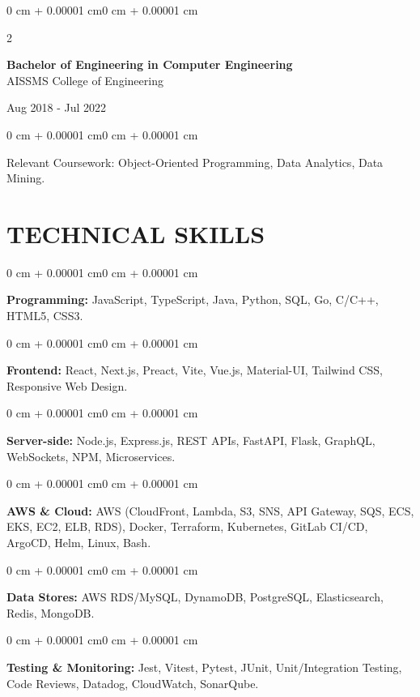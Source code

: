 \documentclass[10pt, letterpaper]{article}
\newenvironment{onecolentry}{
    \begin{adjustwidth}{0 cm + 0.00001 cm}{0 cm + 0.00001 cm}
}{
    \end{adjustwidth}
}
\newenvironment{twocolentry}[2][]{
    \onecolentry
    \def\secondColumn{#2}
    \setcolumnwidth{\fill, 4.5 cm}
    \begin{paracol}{2}
}{
    \switchcolumn \raggedleft \secondColumn
    \end{paracol}
    \endonecolentry
}
\begin{document}
\begin{twocolentry}{
    Aug 2018 - Jul 2022
}
    \textbf{Bachelor of Engineering in Computer Engineering} \\
    AISSMS College of Engineering
\end{twocolentry}
\begin{onecolentry}
Relevant Coursework: Object-Oriented Programming, Data Analytics, Data Mining.
\end{onecolentry}
\section{TECHNICAL SKILLS}
\begin{onecolentry}
\textbf{Programming:} JavaScript, TypeScript, Java, Python, SQL, Go, C/C++, HTML5, CSS3.
\end{onecolentry}
\vspace{0.06 cm}
\begin{onecolentry}
\textbf{Frontend:} React, Next.js, Preact, Vite, Vue.js, Material-UI, Tailwind CSS, Responsive Web Design.
\end{onecolentry}
\vspace{0.06 cm}
\begin{onecolentry}
\textbf{Server-side:} Node.js, Express.js, REST APIs, FastAPI, Flask, GraphQL, WebSockets, NPM, Microservices.
\end{onecolentry}
\vspace{0.06 cm}
\begin{onecolentry}
\textbf{AWS \& Cloud:} AWS (CloudFront, Lambda, S3, SNS, API Gateway, SQS, ECS, EKS, EC2, ELB, RDS), Docker, Terraform, Kubernetes, GitLab CI/CD, ArgoCD, Helm, Linux, Bash.
\end{onecolentry}
\vspace{0.06 cm}
\begin{onecolentry}
\textbf{Data Stores:} AWS RDS/MySQL, DynamoDB, PostgreSQL, Elasticsearch, Redis, MongoDB.
\end{onecolentry}
\vspace{0.06 cm}
\begin{onecolentry}
\textbf{Testing \& Monitoring:} Jest, Vitest, Pytest, JUnit, Unit/Integration Testing, Code Reviews, Datadog, CloudWatch, SonarQube.
\end{onecolentry}

\end{document}
